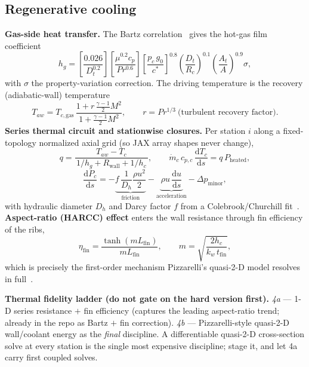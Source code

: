 \documentclass[11pt]{article}
\newcommand{\dd}[2]{\frac{\mathrm{d}#1}{\mathrm{d}#2}}
\newcommand{\mdot}{\dot m}
\newcommand{\cstar}{c^{*}}
\begin{document}
\subsection{Regenerative cooling}
\textbf{Gas-side heat transfer.} The Bartz correlation~\cite{bartz1957} gives the
hot-gas film coefficient
\begin{equation}
h_g=\left[\frac{0.026}{D_t^{0.2}}\right]
\!\left[\frac{\mu^{0.2}c_p}{Pr^{0.6}}\right]
\!\left[\frac{p_c\,g_0}{\cstar}\right]^{0.8}
\!\left(\frac{D_t}{R_c}\right)^{0.1}
\!\left(\frac{A_t}{A}\right)^{0.9}\sigma,
\end{equation}
with $\sigma$ the property-variation correction. The driving temperature is the
recovery (adiabatic-wall) temperature
\begin{equation}
T_{aw}=T_{c,\mathrm{gas}}\,
\frac{1+r\,\tfrac{\gamma-1}{2}M^{2}}{1+\tfrac{\gamma-1}{2}M^{2}},
\qquad r=Pr^{1/3}\ \text{(turbulent recovery factor)} .
\end{equation}
\textbf{Series thermal circuit and stationwise closures.} Per station $i$ along
a fixed-topology normalized axial grid (so JAX array shapes never change),
\begin{equation}
q=\frac{T_{aw}-T_c}{\,1/h_g+R_\mathrm{wall}+1/h_c\,},
\qquad
\mdot_c\,c_{p,c}\,\dd{T_c}{s}=q\,P_\mathrm{heated},
\end{equation}
\begin{equation}
\dd{P_c}{s}=-\underbrace{f\,\frac{1}{D_h}\frac{\rho u^{2}}{2}}_{\text{friction}}
-\underbrace{\rho u\,\dd{u}{s}}_{\text{acceleration}}
-\Delta p_\mathrm{minor},
\end{equation}
with hydraulic diameter $D_h$ and Darcy factor $f$ from a Colebrook/Churchill
fit~\cite{white}. \textbf{Aspect-ratio (HARCC) effect} enters the wall resistance
through fin efficiency of the ribs,
\begin{equation}
\eta_\mathrm{fin}=\frac{\tanh(mL_\mathrm{fin})}{mL_\mathrm{fin}},
\qquad m=\sqrt{\frac{2h_c}{k_w\,t_\mathrm{fin}}},
\end{equation}
which is precisely the first-order mechanism Pizzarelli's quasi-2-D model
resolves in full~\cite{pizzarelli2011,carlile1992}.

\begin{keybox}
\textbf{Thermal fidelity ladder (do not gate on the hard version first).}
\emph{4a} --- 1-D series resistance $+$ fin efficiency (captures the leading
aspect-ratio trend; already in the repo as Bartz $+$ fin correction).
\emph{4b} --- Pizzarelli-style quasi-2-D wall/coolant energy as the \emph{final}
discipline. A differentiable quasi-2-D cross-section solve at every station is
the single most expensive discipline; stage it, and let 4a carry first coupled
solves.
\end{keybox}
\end{document}
